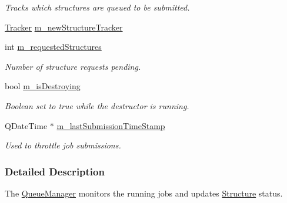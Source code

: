 \begin{DoxyCompactItemize}
\begin{DoxyCompactList}\small\item\em Tracks which structures are queued to be submitted. \end{DoxyCompactList}\item 
\hyperlink{classGlobalSearch_1_1Tracker}{Tracker} \hyperlink{classGlobalSearch_1_1QueueManager_ab93522c4a198ea3401baf662b00a7ec7}{m\+\_\+new\+Structure\+Tracker}
\item 
\hypertarget{classGlobalSearch_1_1QueueManager_ae8f5365d11d9db4bb8607a909b843cce}{}int \hyperlink{classGlobalSearch_1_1QueueManager_ae8f5365d11d9db4bb8607a909b843cce}{m\+\_\+requested\+Structures}\label{classGlobalSearch_1_1QueueManager_ae8f5365d11d9db4bb8607a909b843cce}

\begin{DoxyCompactList}\small\item\em Number of structure requests pending. \end{DoxyCompactList}\item 
\hypertarget{classGlobalSearch_1_1QueueManager_a33201e78793ede9a0b2bc233e180664c}{}bool \hyperlink{classGlobalSearch_1_1QueueManager_a33201e78793ede9a0b2bc233e180664c}{m\+\_\+is\+Destroying}\label{classGlobalSearch_1_1QueueManager_a33201e78793ede9a0b2bc233e180664c}

\begin{DoxyCompactList}\small\item\em Boolean set to true while the destructor is running. \end{DoxyCompactList}\item 
\hypertarget{classGlobalSearch_1_1QueueManager_a94ba4286ec00cec9516ef9766e4d76a1}{}Q\+Date\+Time $\ast$ \hyperlink{classGlobalSearch_1_1QueueManager_a94ba4286ec00cec9516ef9766e4d76a1}{m\+\_\+last\+Submission\+Time\+Stamp}\label{classGlobalSearch_1_1QueueManager_a94ba4286ec00cec9516ef9766e4d76a1}

\begin{DoxyCompactList}\small\item\em Used to throttle job submissions. \end{DoxyCompactList}\end{DoxyCompactItemize}


\subsubsection{Detailed Description}
The \hyperlink{classGlobalSearch_1_1QueueManager}{Queue\+Manager} monitors the running jobs and updates \hyperlink{classGlobalSearch_1_1Structure}{Structure} status. 

